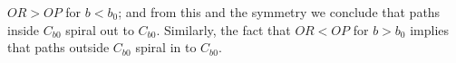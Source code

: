 \documentclass[12pt,a4paper]{article}
\begin{document}
$OR > OP$ for $b < b_0$; and from this and the symmetry we conclude that paths inside $C_{b0}$ spiral out to $C_{b0}$. Similarly, the fact that $OR < OP$ for $b > b_0$ implies that paths outside $C_{b0}$ spiral in to $C_{b0}$.



























































































































\end{document}
